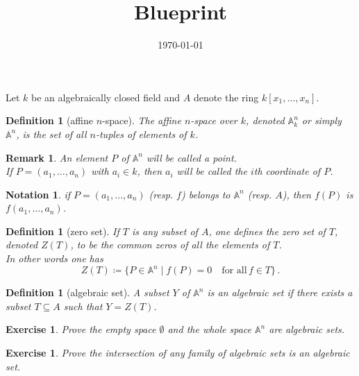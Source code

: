 \documentclass[12pt]{report}
\newtheorem{definition}[proposition]{Definition}
\newtheorem{remark}[proposition]{Remark}
\newtheorem{ex}[proposition]{Exercise}
\newtheorem{notation}{Notation}
\begin{document}
	
\title{Blueprint}
\author{}
\date{\today}
\maketitle


Let $k$ be an algebraically closed field and $A$ denote the ring $k \left[ x_1, \dots, x_n \right]$. \\

\begin{definition}[affine $n$-space] 
	The affine $n$-space over $k$, denoted $\mathbb{A}^n_k$ or simply $\mathbb{A}^n$, is the set of all $n$-tuples of elements of $k$.  
\end{definition}

\begin{remark}
	An element $P$ of $\mathbb{A}^n$ will be called a point. \\
	If $P = (a_1, \dots, a_n)$ with $a_i \in k$, then $a_i$ will be called the $i$th coordinate of $P$.
\end{remark}

\begin{notation}
	if $P = (a_1, \dots, a_n)$ (\textit{resp.} $f$) belongs to $\mathbb{A}^n$ (\textit{resp.} $A$), then $f(P)$ is $f(a_1, \dots, a_n)$.
\end{notation}		

\begin{definition}[zero set]
	If $T$ is any subset of $A$, one defines the zero set of $T$, denoted $Z(T)$, to be the common zeros of all the elements of $T$. \\
	In other words one has
	\[
	Z(T) \coloneqq \lbrace P \in \mathbb{A}^n \mid f(P) = 0 \quad \text{for all}\, f \in T \rbrace \, . 
	\]
\end{definition}

\begin{definition}[algebraic set]
	A subset $Y$ of $\mathbb{A}^n$ is an algebraic set if there exists a subset $T \subseteq A$ such that $Y = Z(T)$. 
\end{definition}

\begin{ex}
	Prove the empty space $\emptyset$ and the whole space $\mathbb{A}^n$ are algebraic sets.
\end{ex}

\begin{ex}
	Prove the intersection of any family of algebraic sets is an algebraic set.
\end{ex}
\end{document}
